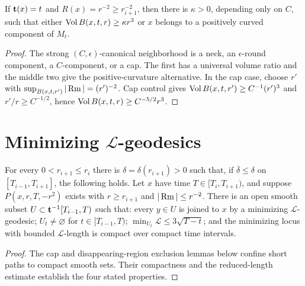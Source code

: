 \begin{proposition}
\label{prop:noncollapsing-small-scale-easy-case}

If ${\bf t}(x)=t$ and $R(x)=r^{-2}\geq r_{i+1}^{-2}$, then there is $\kappa>0$, depending only on $C$, such that either $\operatorname{Vol} B(x,t,r)\geq\kappa r^3$ or $x$ belongs to a positively curved component of $M_t$.
\end{proposition}
\begin{proof}
\sketch The strong $(C,\epsilon)$-canonical neighborhood is a neck, an $\epsilon$-round component, a $C$-component, or a cap. The first has a universal volume ratio and the middle two give the positive-curvature alternative. In the cap case, choose $r'$ with $\sup_{B(x,t,r')}|\operatorname{Rm}|=(r')^{-2}$. Cap control gives $\operatorname{Vol} B(x,t,r')\geq C^{-1}(r')^3$ and $r'/r\geq C^{-1/2}$, hence $\operatorname{Vol} B(x,t,r)\geq C^{-5/2}r^3$.
\end{proof}

\section{Minimizing $\mathcal L$-geodesics}

\begin{proposition}
\label{prop:minimizing-L-geodesics-exist}
\label{delta0ri+1}
For every $0<r_{i+1}\leq r_i$ there is $\delta=\delta(r_{i+1})>0$ such that, if $\overline\delta\leq\delta$ on $[T_{i-1},T_{i+1}]$, the following holds. Let $x$ have time $T\in[T_i,T_{i+1})$, and suppose $P(x,r,T,-r^2)$ exists with $r\geq r_{i+1}$ and $|\operatorname{Rm}|\leq r^{-2}$. There is an open smooth subset $U\subset{\bf t}^{-1}[T_{i-1},T)$ such that: every $y\in U$ is joined to $x$ by a minimizing $\mathcal L$-geodesic; $U_t\ne\varnothing$ for $t\in[T_{i-1},T)$; $\min_{U_t}\mathcal L\leq3\sqrt{T-t}$; and the minimizing locus with bounded $\mathcal L$-length is compact over compact time intervals.
\end{proposition}
\begin{proof}
\sketch
{}
The cap and disappearing-region exclusion lemmas below confine short paths to compact smooth sets. Their compactness and the reduced-length estimate establish the four stated properties.
\end{proof}

